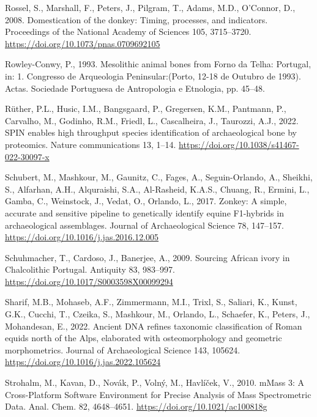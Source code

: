 \documentclass[preprint, 3p, authoryear]{elsarticle} %
\newlength{\cslhangindent}
\newlength{\cslentryspacingunit} %
\newenvironment{CSLReferences}[2] %
 {%
  \setlength{\parindent}{0pt}
  \ifodd #1
  \let\oldpar\par
  \def\par{\hangindent=\cslhangindent\oldpar}
  \fi
  \setlength{\parskip}{#2\cslentryspacingunit}
 }%
 {}
\begin{document}
\begin{CSLReferences}{1}{0}
\leavevmode{}%
Rossel, S., Marshall, F., Peters, J., Pilgram, T., Adams, M.D., O'Connor, D., 2008. Domestication of the donkey: {Timing}, processes, and indicators. Proceedings of the National Academy of Sciences 105, 3715--3720. \url{https://doi.org/10.1073/pnas.0709692105}

\leavevmode{}%
Rowley-Conwy, P., 1993. Mesolithic animal bones from {Forno} da {Telha}: {Portugal}, in: 1. {Congresso} de {Arqueologia Peninsular}:({Porto}, 12-18 de {Outubro} de 1993). {Actas}. {Sociedade Portuguesa de Antropologia e Etnologia}, pp. 45--48.

\leavevmode{}%
Rüther, P.L., Husic, I.M., Bangsgaard, P., Gregersen, K.M., Pantmann, P., Carvalho, M., Godinho, R.M., Friedl, L., Cascalheira, J., Taurozzi, A.J., 2022. {SPIN} enables high throughput species identification of archaeological bone by proteomics. Nature communications 13, 1--14. \url{https://doi.org/10.1038/s41467-022-30097-x}

\leavevmode{}%
Schubert, M., Mashkour, M., Gaunitz, C., Fages, A., Seguin-Orlando, A., Sheikhi, S., Alfarhan, A.H., Alquraishi, S.A., Al-Rasheid, K.A.S., Chuang, R., Ermini, L., Gamba, C., Weinstock, J., Vedat, O., Orlando, L., 2017. Zonkey: {A} simple, accurate and sensitive pipeline to genetically identify equine {F1-hybrids} in archaeological assemblages. Journal of Archaeological Science 78, 147--157. \url{https://doi.org/10.1016/j.jas.2016.12.005}

\leavevmode{}%
Schuhmacher, T., Cardoso, J., Banerjee, A., 2009. Sourcing {African} ivory in {Chalcolithic Portugal}. Antiquity 83, 983--997. \url{https://doi.org/10.1017/S0003598X00099294}

\leavevmode{}%
Sharif, M.B., Mohaseb, A.F., Zimmermann, M.I., Trixl, S., Saliari, K., Kunst, G.K., Cucchi, T., Czeika, S., Mashkour, M., Orlando, L., Schaefer, K., Peters, J., Mohandesan, E., 2022. Ancient {DNA} refines taxonomic classification of {Roman} equids north of the {Alps}, elaborated with osteomorphology and geometric morphometrics. Journal of Archaeological Science 143, 105624. \url{https://doi.org/10.1016/j.jas.2022.105624}

\leavevmode{}%
Strohalm, M., Kavan, D., Novák, P., Volný, M., Havlíček, V., 2010. {mMass} 3: {A Cross-Platform Software Environment} for {Precise Analysis} of {Mass Spectrometric Data}. Anal. Chem. 82, 4648--4651. \url{https://doi.org/10.1021/ac100818g}


\end{CSLReferences}
\end{document}
